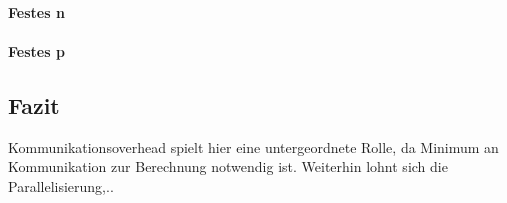 \paragraph{Festes n}
\paragraph{Festes p}

\subsection{Fazit}
Kommunikationsoverhead spielt hier eine untergeordnete Rolle, da Minimum an Kommunikation zur Berechnung notwendig ist.
Weiterhin lohnt sich die Parallelisierung,..


%
%


